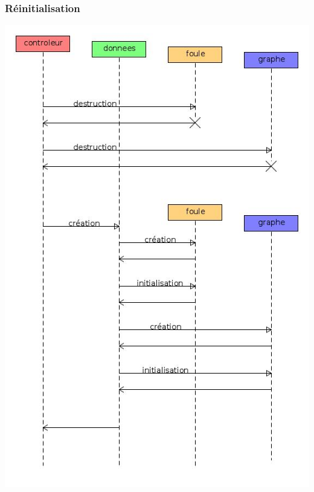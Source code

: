 \subsubsection{Réinitialisation}
\begin{center}
\includegraphics[scale=0.51]{./illustration/sequenceReinitialisation}
\end{center}
%



